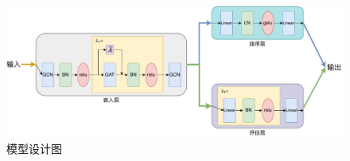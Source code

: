 \begin{figure}[htbp]
    \centering
    \includegraphics[width=1\textwidth]{模型设计图(总).pdf}
    \caption{模型设计图}
    \label{fig:模型设计图}
\end{figure}